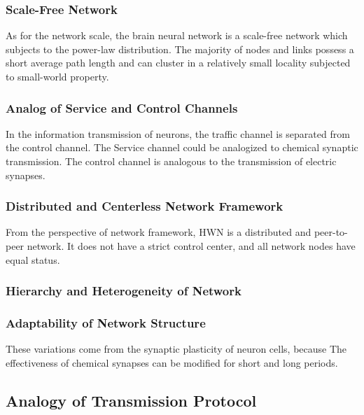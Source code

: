 \documentclass[journal,comsoc]{IEEEtran}
\begin{document}
	\subsubsection{Scale-Free Network}
	As for the network scale, the brain neural network is a scale-free network which subjects to the power-law distribution. 
	The majority of nodes and links possess a short average path length and can cluster in a relatively small locality subjected to small-world property.
	
	\subsubsection{Analog of Service and Control Channels}
	In the information transmission of neurons, the traffic channel is separated from the control channel.
	The Service channel could be analogized to chemical synaptic transmission. 			
	The control channel is analogous to the transmission of electric synapses. 
	
	\subsubsection{Distributed and Centerless Network Framework}
	From the perspective of network framework, HWN is a distributed and peer-to-peer network. 
	It does not have a strict control center, and all network nodes have equal status.
	
	
	\subsubsection{Hierarchy and Heterogeneity of Network}
	
	\subsubsection{Adaptability of Network Structure}
	These variations come from the synaptic plasticity of neuron cells, because The effectiveness of chemical synapses can be modified for short and long periods\cite{kandel2000principles}.
	
	
	\subsection{Analogy of Transmission Protocol}
	
\end{document}
